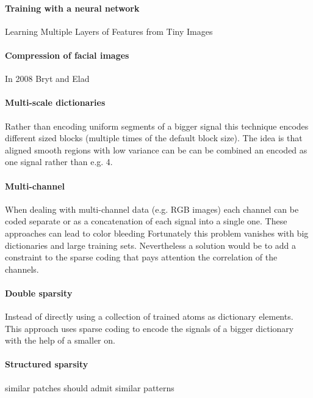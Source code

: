 \paragraph{Training with a neural network}
Learning Multiple Layers of Features from Tiny Images \cite{Krizhevsky2009}

\paragraph{Compression of facial images}
In 2008 Bryt and Elad \cite{Bryt2008} 

\paragraph{Multi-scale dictionaries}
Rather than encoding uniform segments of a bigger signal this technique
encodes different sized blocks (multiple times of the default block size). The
idea is that aligned smooth regions with low variance can be can be combined an
encoded as one signal rather than e.g. 4. \cite{saprioSlides}\cite{Mairal2007}


\paragraph{Multi-channel}
When dealing with multi-channel data (e.g. RGB images) each channel can be coded
separate or as a concatenation of each signal into a single one. These
approaches can lead to color bleeding \cite{mairal08sparse} 
Fortunately this problem vanishes with big dictionaries and large training sets.
\cite{mairal08sparse} Nevertheless a solution would be to add a constraint to
the sparse coding that pays attention the correlation of the channels. 

\paragraph{Double sparsity}
Instead of directly using a collection of trained atoms as dictionary
elements. This approach uses sparse coding to encode the signals of a bigger
dictionary with the help of a smaller on.\cite{Rubinstein2009} 

\paragraph{Structured sparsity}
similar patches should admit similar patterns \cite{Mairal2009} 
\cite{group sparsity}

